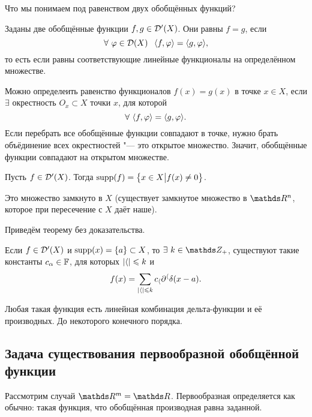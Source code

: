 Что мы понимаем под равенством двух обобщённых функций?
\begin{Def}
Заданы две обобщённые функции $f,g\in\mathcal D'(X)$. Они равны $f=g$, если
\[
  \forall\ \phi\in\D(X)\pau \la f,\phi\ra = \la g,\phi\ra,
\]
то есть если равны соответствующие линейные функционалы на определённом множестве.

Можно определеить равенство функционалов $f(x)=g(x)$ в точке $x\in X$, если $\exists$ окрестность $O_x\subset X$ точки $x$, для которой
\[
  \forall\ \langle f,\varphi\rangle = \langle g,\varphi\rangle.
\]
Если перебрать все обобщённые функции совпадают в точке, нужно брать объёдинение всех окрестностей "--- это открытое множество. Значит, обобщённые функции совпадают на открытом множестве.
\end{Def}

\begin{Def}
 Пусть $f\in\mathcal D'(X)$. Тогда $\operatorname{supp}(f) = \big\{x\in X\big|f(x)\ne0\big\}$.
\end{Def}
Это множество замкнуто в $X$ (существует замкнутое множество в $\R^n$, которое при пересечение с $X$ даёт наше).

Приведём теорему без доказательства.
\begin{The}
  Если $f\in\mathcal D'(X)$ и $\operatorname{supp}(x) = \{a\}\subset X$, то $\exists\ k\in\Z_+$, существуют такие константы $c_\alpha\in\mathbb F$, для которых $|\langle|\leqslant k$ и
\[
  f(x) = \sum\limits_{|\langle|\leqslant k}c_\langle\partial^\langle\delta(x-a).
\]
\end{The}
Любая такая функция есть линейная комбинация дельта-функции и её производных. До некоторого конечного порядка.


\subsection{Задача существования первообразной обобщённой функции}
Рассмотрим случай $\R^m=\R$. Первообразная определяется как обычно: такая функция, что обобщённая производная равна заданной.

